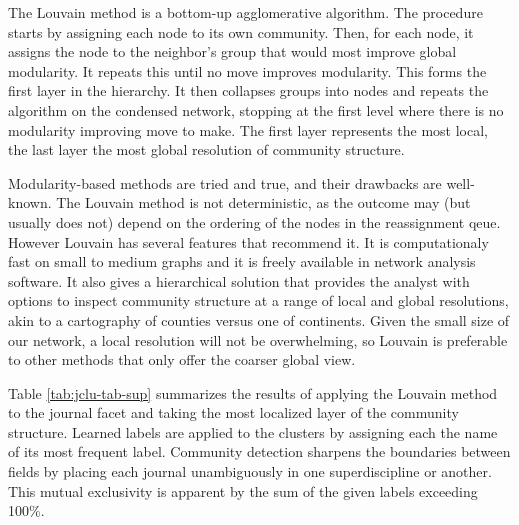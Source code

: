 \documentclass[]{book}
\begin{document}
The Louvain method is a bottom-up agglomerative algorithm. The procedure
starts by assigning each node to its own community. Then, for each node,
it assigns the node to the neighbor's group that would most improve
global modularity. It repeats this until no move improves modularity.
This forms the first layer in the hierarchy. It then collapses groups
into nodes and repeats the algorithm on the condensed network, stopping
at the first level where there is no modularity improving move to make.
The first layer represents the most local, the last layer the most
global resolution of community structure.

Modularity-based methods are tried and true, and their drawbacks are
well-known. The Louvain method is not deterministic, as the outcome may
(but usually does not) depend on the ordering of the nodes in the
reassignment qeue. However Louvain has several features that recommend
it. It is computationaly fast on small to medium graphs and it is freely
available in network analysis software. It also gives a hierarchical
solution that provides the analyst with options to inspect community
structure at a range of local and global resolutions, akin to a
cartography of counties versus one of continents. Given the small size
of our network, a local resolution will not be overwhelming, so Louvain
is preferable to other methods that only offer the coarser global view.

Table \ref{tab:jclu-tab-sup} summarizes the results of applying the
Louvain method to the journal facet and taking the most localized layer
of the community structure. Learned labels are applied to the clusters
by assigning each the name of its most frequent label. Community
detection sharpens the boundaries between fields by placing each journal
unambiguously in one superdiscipline or another. This mutual exclusivity
is apparent by the sum of the given labels exceeding 100\%.
\end{document}
